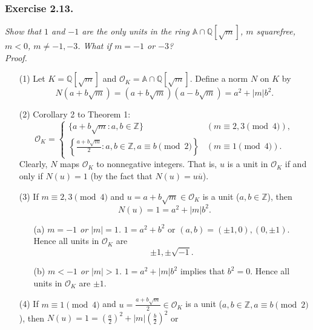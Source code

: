 \documentclass{article}
\begin{document}



\subsubsection*{Exercise 2.13.}
\emph{Show that $1$ and $-1$ are the only units in the ring
$\mathbb{A} \cap \mathbb{Q}[\sqrt{m}]$, $m$ squarefree, $m < 0$,
$m \neq -1, -3$.
What if $m = -1$ or $-3$?} \\

\emph{Proof.}
\begin{enumerate}
\item[(1)]
Let $K = \mathbb{Q}[\sqrt{m}]$ and $\mathcal{O}_K = \mathbb{A} \cap \mathbb{Q}[\sqrt{m}]$.
Define a norm $N$ on $K$
by $$N(a+b\sqrt{m}) = (a+b\sqrt{m})(a-b\sqrt{m}) = a^2 + |m|b^2.$$
\item[(2)]
Corollary 2 to Theorem 1:
\begin{equation*}
  \mathcal{O}_K =
    \begin{cases}
      \{ a+b\sqrt{m} : a,b \in \mathbb{Z} \}
        & (m \equiv 2,3 \pmod{4}), \\
      \left\{ \frac{a+b\sqrt{m}}{2} : a,b \in \mathbb{Z}, a \equiv b \pmod{2} \right\}
        & (m \equiv 1 \pmod{4}).
    \end{cases}
\end{equation*}
Clearly, $N$ maps $\mathcal{O}_K$ to nonnegative integers.
That is, $u$ is a unit in $\mathcal{O}_K$ if and only if $N(u) = 1$
(by the fact that $N(u) = u \overline{u}$).
\item[(3)]
If $m \equiv 2,3 \pmod{4}$ and $u = a + b\sqrt{m} \in \mathcal{O}_K$ is a unit
($a, b \in \mathbb{Z}$),
then $$N(u) = 1 = a^2 + |m|b^2.$$
  \begin{enumerate}
  \item[(a)]
  \emph{$m = -1$ or $|m| = 1$.}
  $1 = a^2 + b^2$ or $(a,b) = (\pm 1,0), (0, \pm 1)$.
  Hence all units in $\mathcal{O}_K$ are
  $$\pm 1, \pm \sqrt{-1}.$$
  \item[(b)]
  \emph{$m < -1$ or $|m| > 1$.}
  $1 = a^2 + |m|b^2$ implies that $b^2 = 0$.
  Hence all units in $\mathcal{O}_K$ are $\pm 1$.
  \end{enumerate}
\item[(4)]
If $m \equiv 1 \pmod{4}$ and $u = \frac{a + b\sqrt{m}}{2} \in \mathcal{O}_K$ is a unit
($a, b \in \mathbb{Z}, a \equiv b \pmod{2}$),
then $N(u) = 1 = (\frac{a}{2})^2 + |m|(\frac{b}{2})^2$ or

\end{enumerate}
\end{document}
